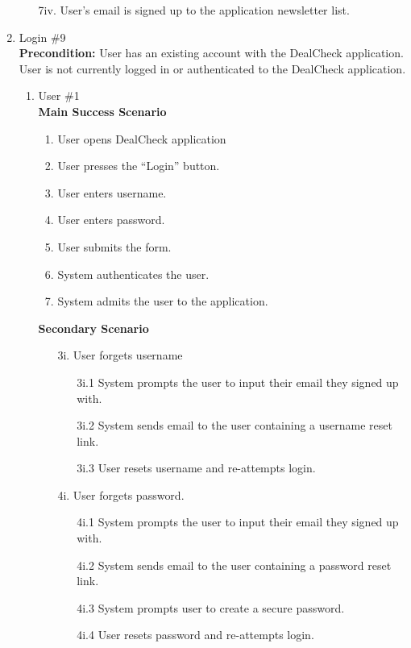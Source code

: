 \documentclass[]{article}
\begin{document}
\begin{enumerate}[{\bf {BE}1.}]
\begin{enumerate}
		\item [7iv.] User’s email is signed up to the application newsletter list.
	\end{enumerate}

	\item Login \#9 \\

	{\bf Precondition:} User has an existing account with the DealCheck application. 
	User is not currently logged in or authenticated to the DealCheck application.
	\begin{enumerate}[{\bf VP1.}]
		\item User \#1 \\
		{\bf Main Success Scenario}
		\begin{enumerate}[1.]
			\item User opens DealCheck application
			\item User presses the “Login” button.
			\item User enters username.
			\item User enters password.
			\item User submits the form.
			\item System authenticates the user.
			\item System admits the user to the application.
		\end{enumerate}
		{\bf Secondary Scenario} \\
		\begin{enumerate}
                \item [3i.] User forgets username
    		\begin{enumerate}
    			\item [3i.1] System prompts the user to input their email they signed up with.
    			\item [3i.2] System sends email to the user containing a username reset link.
    			\item [3i.3] User resets username and re-attempts login.
    		\end{enumerate}
    		\item [4i.] User forgets password.
    		\begin{enumerate}
    			\item [4i.1] System prompts the user to input their email they signed up with.
    			\item [4i.2] System sends email to the user containing a password reset link.
    			\item [4i.3] System prompts user to create a secure password.
    			\item [4i.4] User resets password and re-attempts login.

\end{enumerate}
\end{enumerate}
\end{enumerate}
\end{enumerate}
\end{document}
